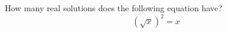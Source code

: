\documentclass{ximera}
\author{David Kish}
\begin{document}
\begin{exercise}
How many real solutions does the following equation have? \\
\[
{(\sqrt{x})}^2=x
\]
\begin{multipleChoice}  
\end{multipleChoice}  
\end{exercise}
\end{document}
